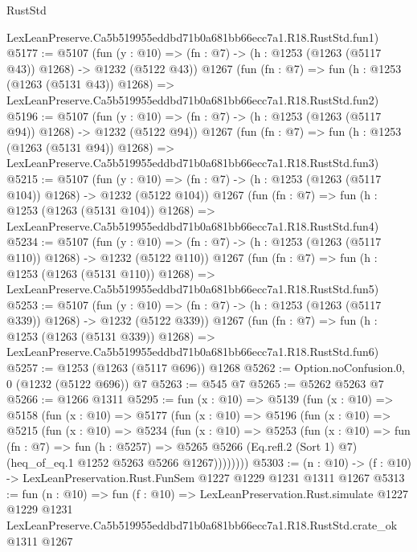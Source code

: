 \begin{lexlean}{RustStd}
\begin{coremodule}
    LexLeanPreserve.Ca5b519955eddbd71b0a681bb66ecc7a1.R18.RustStd.fun1)
@5177 := @5107
    (fun (y : @10) => (fn : @7) -> (h : @1253 (@1263 (@5117 @43)) @1268) -> @1232 (@5122 @43))
    @1267
    (fun (fn : @7) =>
    fun (h : @1253 (@1263 (@5131 @43)) @1268) =>
    LexLeanPreserve.Ca5b519955eddbd71b0a681bb66ecc7a1.R18.RustStd.fun2)
@5196 := @5107
    (fun (y : @10) => (fn : @7) -> (h : @1253 (@1263 (@5117 @94)) @1268) -> @1232 (@5122 @94))
    @1267
    (fun (fn : @7) =>
    fun (h : @1253 (@1263 (@5131 @94)) @1268) =>
    LexLeanPreserve.Ca5b519955eddbd71b0a681bb66ecc7a1.R18.RustStd.fun3)
@5215 := @5107
    (fun (y : @10) => (fn : @7) -> (h : @1253 (@1263 (@5117 @104)) @1268) -> @1232 (@5122 @104))
    @1267
    (fun (fn : @7) =>
    fun (h : @1253 (@1263 (@5131 @104)) @1268) =>
    LexLeanPreserve.Ca5b519955eddbd71b0a681bb66ecc7a1.R18.RustStd.fun4)
@5234 := @5107
    (fun (y : @10) => (fn : @7) -> (h : @1253 (@1263 (@5117 @110)) @1268) -> @1232 (@5122 @110))
    @1267
    (fun (fn : @7) =>
    fun (h : @1253 (@1263 (@5131 @110)) @1268) =>
    LexLeanPreserve.Ca5b519955eddbd71b0a681bb66ecc7a1.R18.RustStd.fun5)
@5253 := @5107
    (fun (y : @10) => (fn : @7) -> (h : @1253 (@1263 (@5117 @339)) @1268) -> @1232 (@5122 @339))
    @1267
    (fun (fn : @7) =>
    fun (h : @1253 (@1263 (@5131 @339)) @1268) =>
    LexLeanPreserve.Ca5b519955eddbd71b0a681bb66ecc7a1.R18.RustStd.fun6)
@5257 := @1253 (@1263 (@5117 @696)) @1268
@5262 := Option.noConfusion.{0, 0} (@1232 (@5122 @696)) @7
@5263 := @545 @7
@5265 := @5262 @5263 @7
@5266 := @1266 @1311
@5295 := fun (x : @10) =>
  @5139
    (fun (x : @10) =>
    @5158
      (fun (x : @10) =>
      @5177
        (fun (x : @10) =>
        @5196
          (fun (x : @10) =>
          @5215
            (fun (x : @10) =>
            @5234
              (fun (x : @10) =>
              @5253
                (fun (x : @10) =>
                fun (fn : @7) =>
                fun (h : @5257) =>
                @5265 @5266 (Eq.refl.{2} (Sort 1) @7) (heq_of_eq.{1} @1252 @5263 @5266 @1267))))))))
@5303 := (n : @10) -> (f : @10) -> LexLeanPreservation.Rust.FunSem @1227 @1229 @1231 @1311 @1267
@5313 := fun (n : @10) =>
  fun (f : @10) =>
  LexLeanPreservation.Rust.simulate
    @1227
    @1229
    @1231
    LexLeanPreserve.Ca5b519955eddbd71b0a681bb66ecc7a1.R18.RustStd.crate_ok
    @1311
    @1267
\end{coremodule}
\end{lexlean}
